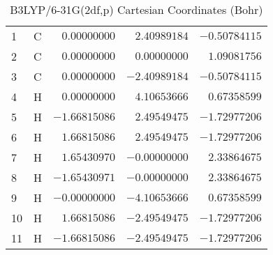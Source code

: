 \documentclass[10pt,oneside]{article}
\begin{document}
\begin{table}[h]
\centering
\caption{B3LYP/6-31G(2df,p) Cartesian Coordinates (Bohr)}
\begin{tabular}{llrrr}
\toprule
1  & C  & $ 0.00000000$ & $ 2.40989184$ & $-0.50784115$ \\
2  & C  & $ 0.00000000$ & $ 0.00000000$ & $ 1.09081756$ \\
3  & C  & $ 0.00000000$ & $-2.40989184$ & $-0.50784115$ \\
4  & H  & $ 0.00000000$ & $ 4.10653666$ & $ 0.67358599$ \\
5  & H  & $-1.66815086$ & $ 2.49549475$ & $-1.72977206$ \\
6  & H  & $ 1.66815086$ & $ 2.49549475$ & $-1.72977206$ \\
7  & H  & $ 1.65430970$ & $-0.00000000$ & $ 2.33864675$ \\
8  & H  & $-1.65430971$ & $-0.00000000$ & $ 2.33864675$ \\
9  & H  & $-0.00000000$ & $-4.10653666$ & $ 0.67358599$ \\
10 & H  & $ 1.66815086$ & $-2.49549475$ & $-1.72977206$ \\
11 & H  & $-1.66815086$ & $-2.49549475$ & $-1.72977206$ \\
\bottomrule
\end{tabular}
\end{table}
\end{document}
